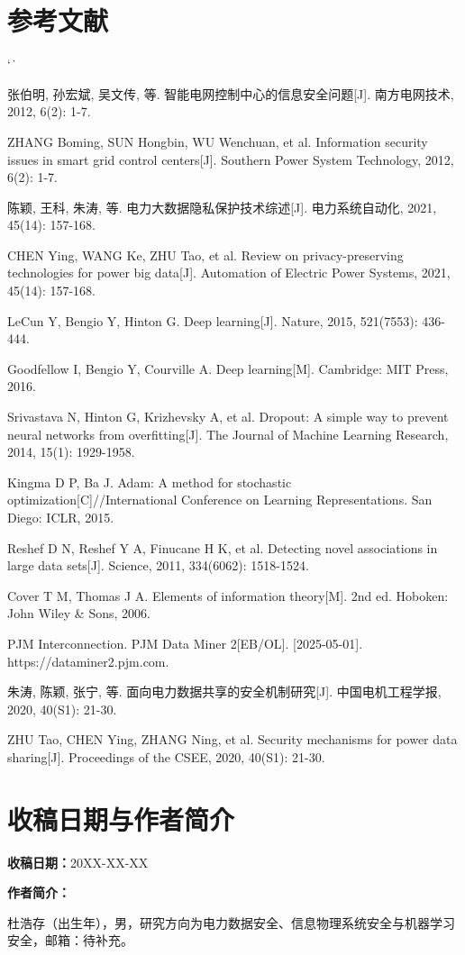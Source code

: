 \documentclass[UTF8,zihao=5,twoside]{ctexart}
\makeatletter
\numberwithin{equation}{section}
\renewcommand{\refname}{参考文献}
\renewenvironment{thebibliography}[1]{%
  \section*{\refname}%
  \small
  \list{[\arabic{enumi}]}{%
    \settowidth\labelwidth{[#1]}%
    \leftmargin\labelwidth
    \advance\leftmargin\labelsep
    \usecounter{enumi}}
  \sloppy\clubpenalty4000\widowpenalty4000\sfcode`\.\ \@m
}{\def\@noitemerr{\@latex@warning{Empty `thebibliography' environment}}\endlist}
\makeatother
\begin{document}
\begin{thebibliography}{99}
张伯明, 孙宏斌, 吴文传, 等. 智能电网控制中心的信息安全问题[J]. 南方电网技术, 2012, 6(2): 1-7.

ZHANG Boming, SUN Hongbin, WU Wenchuan, et al. Information security issues in smart grid control centers[J]. Southern Power System Technology, 2012, 6(2): 1-7.

陈颖, 王科, 朱涛, 等. 电力大数据隐私保护技术综述[J]. 电力系统自动化, 2021, 45(14): 157-168.

CHEN Ying, WANG Ke, ZHU Tao, et al. Review on privacy-preserving technologies for power big data[J]. Automation of Electric Power Systems, 2021, 45(14): 157-168.

LeCun Y, Bengio Y, Hinton G. Deep learning[J]. Nature, 2015, 521(7553): 436-444.

Goodfellow I, Bengio Y, Courville A. Deep learning[M]. Cambridge: MIT Press, 2016.

Srivastava N, Hinton G, Krizhevsky A, et al. Dropout: A simple way to prevent neural networks from overfitting[J]. The Journal of Machine Learning Research, 2014, 15(1): 1929-1958.

Kingma D P, Ba J. Adam: A method for stochastic optimization[C]//International Conference on Learning Representations. San Diego: ICLR, 2015.

Reshef D N, Reshef Y A, Finucane H K, et al. Detecting novel associations in large data sets[J]. Science, 2011, 334(6062): 1518-1524.

Cover T M, Thomas J A. Elements of information theory[M]. 2nd ed. Hoboken: John Wiley \& Sons, 2006.

PJM Interconnection. PJM Data Miner 2[EB/OL]. [2025-05-01]. https://dataminer2.pjm.com.

朱涛, 陈颖, 张宁, 等. 面向电力数据共享的安全机制研究[J]. 中国电机工程学报, 2020, 40(S1): 21-30.

ZHU Tao, CHEN Ying, ZHANG Ning, et al. Security mechanisms for power data sharing[J]. Proceedings of the CSEE, 2020, 40(S1): 21-30.
\end{thebibliography}

\section*{收稿日期与作者简介}
\noindent\textbf{收稿日期：}20XX-XX-XX

\noindent\textbf{作者简介：}\par
\noindent 杜浩存（出生年），男，研究方向为电力数据安全、信息物理系统安全与机器学习安全，邮箱：待补充。
\end{document}
